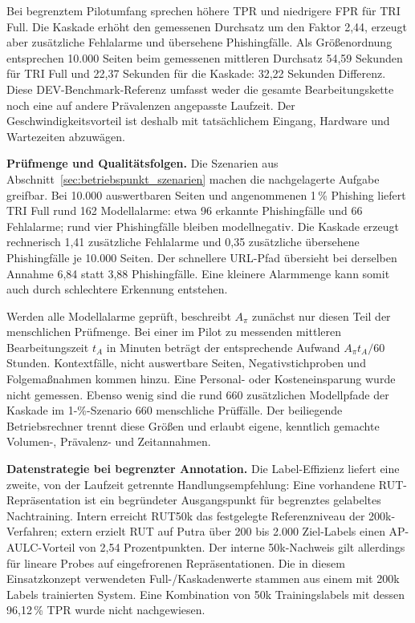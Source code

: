Bei begrenztem Pilotumfang sprechen höhere TPR und niedrigere FPR für TRI Full.
Die Kaskade erhöht den gemessenen Durchsatz um den Faktor 2,44, erzeugt aber zusätzliche
Fehlalarme und übersehene Phishingfälle. Als Größenordnung entsprechen 10.000 Seiten
beim gemessenen mittleren Durchsatz 54,59 Sekunden für TRI Full und 22,37 Sekunden für
die Kaskade: 32,22 Sekunden Differenz. Diese DEV-Benchmark-Referenz umfasst weder
die gesamte Bearbeitungskette noch eine auf andere Prävalenzen angepasste Laufzeit.
Der Geschwindigkeitsvorteil ist deshalb mit tatsächlichem Eingang, Hardware und Wartezeiten abzuwägen.

\textbf{Prüfmenge und Qualitätsfolgen.}
Die Szenarien aus Abschnitt~\ref{sec:betriebspunkt_szenarien} machen die nachgelagerte
Aufgabe greifbar. Bei 10.000 auswertbaren Seiten und angenommenen 1\,\% Phishing liefert
TRI Full rund 162 Modellalarme: etwa 96 erkannte Phishingfälle und 66 Fehlalarme;
rund vier Phishingfälle bleiben modellnegativ. Die Kaskade erzeugt rechnerisch 1,41
zusätzliche Fehlalarme und 0,35 zusätzliche übersehene Phishingfälle je 10.000 Seiten.
Der schnellere URL-Pfad übersieht bei derselben Annahme 6,84 statt 3,88 Phishingfälle.
Eine kleinere Alarmmenge kann somit auch durch schlechtere Erkennung entstehen.

Werden alle Modellalarme geprüft, beschreibt $A_{\pi}$ zunächst nur diesen Teil der
menschlichen Prüfmenge. Bei einer im Pilot zu messenden mittleren Bearbeitungszeit
$t_A$ in Minuten beträgt der entsprechende Aufwand $A_{\pi}t_A/60$ Stunden.
Kontextfälle, nicht auswertbare Seiten, Negativstichproben und Folgemaßnahmen kommen hinzu.
Eine Personal- oder Kosteneinsparung wurde nicht gemessen. Ebenso wenig sind die rund
660 zusätzlichen Modellpfade der Kaskade im 1-\%-Szenario 660 menschliche Prüffälle.
Der beiliegende Betriebsrechner trennt diese Größen und erlaubt eigene, kenntlich
gemachte Volumen-, Prävalenz- und Zeitannahmen.

\textbf{Datenstrategie bei begrenzter Annotation.}
Die Label-Effizienz liefert eine zweite, von der Laufzeit getrennte Handlungsempfehlung:
Eine vorhandene RUT-Repräsentation ist ein begründeter Ausgangspunkt für begrenztes
gelabeltes Nachtraining. Intern erreicht RUT50k das festgelegte Referenzniveau der
200k-Verfahren; extern erzielt RUT auf Putra über 200 bis 2.000 Ziel-Labels einen
AP-AULC-Vorteil von 2,54 Prozentpunkten. Der interne 50k-Nachweis gilt allerdings für
lineare Probes auf eingefrorenen Repräsentationen. Die in diesem Einsatzkonzept
verwendeten Full-/Kaskadenwerte stammen aus einem mit 200k Labels trainierten System.
Eine Kombination von 50k Trainingslabels mit dessen 96,12\,\% TPR wurde nicht nachgewiesen.

